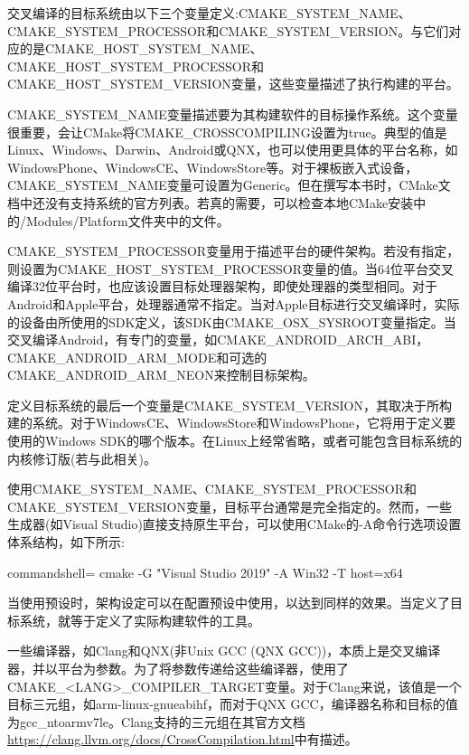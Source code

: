 
交叉编译的目标系统由以下三个变量定义:CMAKE\_SYSTEM\_NAME、CMAKE\_SYSTEM\_PROCESSOR和CMAKE\_SYSTEM\_VERSION。与它们对应的是CMAKE\_HOST\_SYSTEM\_NAME、CMAKE\_HOST\_SYSTEM\_PROCESSOR和CMAKE\_HOST\_SYSTEM\_VERSION变量，这些变量描述了执行构建的平台。

CMAKE\_SYSTEM\_NAME变量描述要为其构建软件的目标操作系统。这个变量很重要，会让CMake将CMAKE\_CROSSCOMPILING设置为true。典型的值是Linux、Windows、Darwin、Android或QNX，也可以使用更具体的平台名称，如WindowsPhone、WindowsCE、WindowsStore等。对于裸板嵌入式设备，CMAKE\_SYSTEM\_NAME变量可设置为Generic。但在撰写本书时，CMake文档中还没有支持系统的官方列表。若真的需要，可以检查本地CMake安装中的/Modules/Platform文件夹中的文件。

CMAKE\_SYSTEM\_PROCESSOR变量用于描述平台的硬件架构。若没有指定，则设置为CMAKE\_HOST\_SYSTEM\_PROCESSOR变量的值。当64位平台交叉编译32位平台时，也应该设置目标处理器架构，即使处理器的类型相同。对于Android和Apple平台，处理器通常不指定。当对Apple目标进行交叉编译时，实际的设备由所使用的SDK定义，该SDK由CMAKE\_OSX\_SYSROOT变量指定。当交叉编译Android，有专门的变量，如CMAKE\_ANDROID\_ARCH\_ABI，CMAKE\_ANDROID\_ARM\_MODE和可选的CMAKE\_ANDROID\_ARM\_NEON来控制目标架构。

定义目标系统的最后一个变量是CMAKE\_SYSTEM\_VERSION，其取决于所构建的系统。对于WindowsCE、WindowsStore和WindowsPhone，它将用于定义要使用的Windows SDK的哪个版本。在Linux上经常省略，或者可能包含目标系统的内核修订版(若与此相关)。

使用CMAKE\_SYSTEM\_NAME、CMAKE\_SYSTEM\_PROCESSOR和CMAKE\_SYSTEM\_VERSION变量，目标平台通常是完全指定的。然而，一些生成器(如Visual Studio)直接支持原生平台，可以使用CMake的-A命令行选项设置体系结构，如下所示:

\begin{tcblisting}{commandshell={}}
cmake -G "Visual Studio 2019" -A Win32 -T host=x64
\end{tcblisting}

当使用预设时，架构设定可以在配置预设中使用，以达到同样的效果。当定义了目标系统，就等于定义了实际构建软件的工具。

一些编译器，如Clang和QNX(非Unix GCC (QNX GCC))，本质上是交叉编译器，并以平台为参数。为了将参数传递给这些编译器，使用了CMAKE\_<LANG>\_COMPILER\_TARGET变量。对于Clang来说，该值是一个目标三元组，如arm-linux-gnueabihf，而对于QNX GCC，编译器名称和目标的值为gcc\_ntoarmv7le。Clang支持的三元组在其官方文档\url{https://clang.llvm.org/docs/CrossCompilation.html}中有描述。

